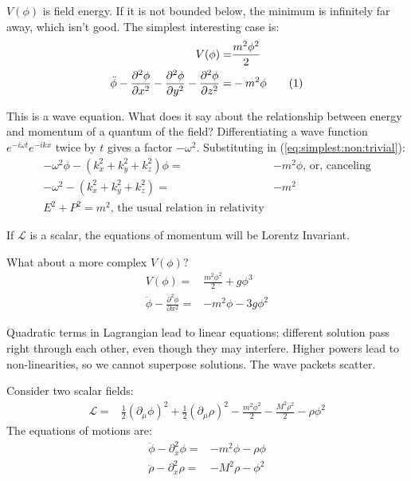 \documentclass[]{article}
\newcommand\numberthis{\addtocounter{equation}{1}\tag{\theequation}}
\begin{document}
$V(\phi)$ is field energy. If it is not bounded below, the minimum is infinitely far away, which isn't good.  The simplest interesting case is:
\begin{align*}
	V(\phi) =& \frac{m^2 \phi^2}{2}\\
	\ddot{\phi} - \frac{\partial^2 \phi}{\partial x^2}  - \frac{\partial^2 \phi}{\partial y^2}  - \frac{\partial^2 \phi}{\partial z^2} =& - m^2 \phi \numberthis \label{eq:simplest:non:trivial}
\end{align*}

This is a wave equation. What does it say about the relationship between energy and momentum of a quantum of the field? Differentiating a wave function $e^{-i \omega t} e^{-i k x}$ twice by $t$ gives a factor $-\omega^2$. Substituting in (\ref{eq:simplest:non:trivial}):
\begin{align*}
	-\omega^2 \phi - (k_x^2+k_y^2+k_z^2)\phi =& -m^2 \phi \text{, or, canceling}\\
	-\omega^2  - (k_x^2+k_y^2+k_z^2) =& -m^2 \\
	E^2 + P^2 = m^2 \text{, the usual relation in relativity}
\end{align*}

If $\mathcal{L}$ is a scalar, the equations of momentum will be Lorentz Invariant.

What about a more complex $V(\phi)$?
\begin{align*}
	V(\phi) =& \frac{m^2 \phi^2}{2} + g \phi^3\\
	\ddot{\phi} - \frac{\partial^2 \phi}{\partial x^2}  =& - m^2 \phi - 3 g \phi^2
\end{align*}

Quadratic terms in Lagrangian lead to linear equations; different solution pass right through each other, even though they may interfere. Higher powers lead to non-linearities, so we cannot superpose solutions. The wave packets scatter.

Consider two scalar fields:
\begin{align*}
	\mathcal{L} =& \frac{1}{2}(\partial_{\mu} \phi)^2 + \frac{1}{2}(\partial_{\mu} \rho)^2 - \frac{m^2 \phi^2}{2} - \frac{M^2 \rho^2}{2} - \rho \phi^2
\end{align*}
The equations of motions are:
\begin{align*}
	\ddot{\phi} - \partial_x^2 \phi =& -m^2 \phi - \rho \phi\\
	\ddot{\rho} - \partial_x^2 \rho =& -M^2 \rho -\phi^2
\end{align*}
\end{document}
